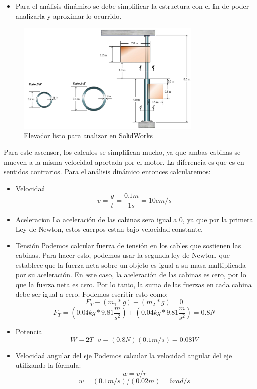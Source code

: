 \documentclass{article}
\theoremstyle{mytheoremstyle}
\theoremstyle{mytheoremstyle}
\theoremstyle{myproblemstyle}
\begin{document}
    \begin{itemize}
    \item Para el análisis dinámico se debe simplificar la estructura con el fin de poder analizarla y aproximar lo ocurrido.
    \end{itemize}
    \begin{figure}[H]
    \centering
    
    \includegraphics[width=0.8\textwidth]{Picture1.jpg}
    \caption{Elevador listo para analizar en SolidWorks}
    \label{fig:imagen3}
    \end{figure}
    \newpage
    Para este ascensor, los calculos se simplifican mucho, ya que ambas cabinas se mueven a la misma velocidad
    aportada por el motor. La diferencia es que es en sentidos contrarios. Para el análisis dinámico entonces calcularemos:

    \begin{itemize}
        \item Velocidad
     \newline
        $$v=\frac{y}{t}=\frac{0.1m}{1s}=10cm/s$$
        \item Aceleracion
        \newline
        La aceleración de las cabinas sera igual a 0, ya que por la primera Ley de Newton, estos cuerpos
        estan bajo velocidad constante. 
        \item Tensión 
        \newline
        Podemos calcular fuerza de tensión en los cables que sostienen las cabinas. Para hacer esto, podemos usar la segunda ley de Newton, que establece que la fuerza neta sobre un objeto es igual a su masa multiplicada por su aceleración. En este caso, la aceleración de las cabinas es cero, por lo que la fuerza neta es cero. Por lo tanto, la suma de las fuerzas en cada cabina debe ser igual a cero. Podemos escribir esto como:
        \newline
       $$F_{T}-\left ( m_{1}*g \right )-\left ( m_{2}*g \right )=0$$
        $$F_{T}=\left ( 0.04kg*9.81\frac{m}{{s}^2} \right )+\left ( 0.04kg*9.81\frac{m}{{s}^2} \right )=0.8N$$
        \item Potencia
        $$W=2T\cdot v=\left ( 0.8N \right )\left ( 0.1m/s \right )=0.08W$$
        \item Velocidad angular del eje
        Podemos calcular la velocidad angular del eje utilizando la fórmula:
        \newline
        $$w = v/r$$
        $$w =\left ( 0.1m/s \right )/\left ( 0.02m \right )=5 rad/s$$
      \end{itemize}
\end{document}

